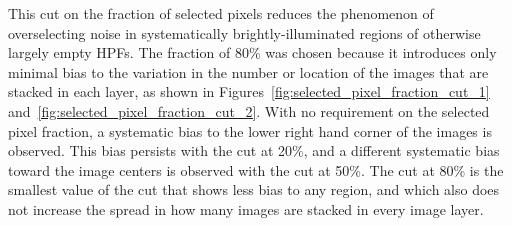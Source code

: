 \documentclass[letterpaper,11pt]{article}
\begin{document}
This cut on the fraction of selected pixels reduces the phenomenon of overselecting noise in systematically brightly-illuminated regions of otherwise largely empty HPFs. The fraction of 80\% was chosen because it introduces only minimal bias to the variation in the number or location of the images that are stacked in each layer, as shown in Figures~\ref{fig:selected_pixel_fraction_cut_1} and~\ref{fig:selected_pixel_fraction_cut_2}. With no requirement on the selected pixel fraction, a systematic bias to the lower right hand corner of the images is observed. This bias persists with the cut at 20\%, and a different systematic bias toward the image centers is observed with the cut at 50\%. The cut at 80\% is the smallest value of the cut that shows less bias to any region, and which also does not increase the spread in how many images are stacked in every image layer.
\end{document}
